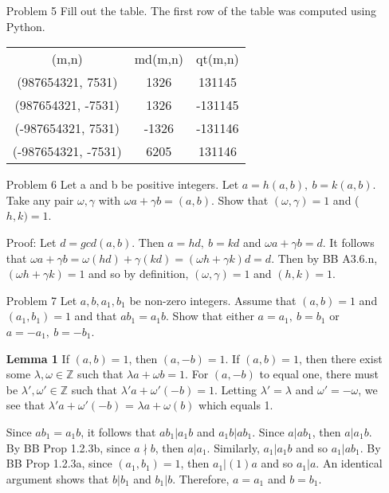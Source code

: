 \documentclass[letterpaper]{article}
\newcommand{\Integers}{\mathbb{Z}}
\begin{document}
\begin{itemize}
      \item[Problem 5] Fill out the table. The first row of the table was computed using Python.
            \begin{center}
                  \begin{tabular}{ c c c }
                        (m,n)               & md(m,n) & qt(m,n) \\
                        (987654321, 7531)   & 1326    & 131145  \\
                        (987654321, -7531)  & 1326    & -131145 \\
                        (-987654321, 7531)  & -1326   & -131146 \\
                        (-987654321, -7531) & 6205    & 131146
                  \end{tabular}
            \end{center}

      \item[Problem 6]Let a and b be positive integers. Let \(a = h(a, b),\ b = k(a, b)\). Take any pair \(\omega, \gamma\) with \(\omega a + \gamma b = (a, b)\). Show that \((\omega, \gamma) = 1\)  and (\(h, k) = 1\).

            Proof: Let \(d = gcd(a, b)\). Then \(a = hd,\ b = kd\) and \(\omega a + \gamma b = d\). It follows that \(\omega a + \gamma b = \omega(hd) + \gamma(kd) = (\omega h + \gamma k)d = d\).
            Then by BB A3.6.n, \((\omega h + \gamma k) = 1\) and so by definition, \((\omega, \gamma) = 1\) and \((h, k) = 1\).

      \item[Problem 7] Let \(a, b, a_1, b_1\) be non-zero integers. Assume that \((a, b) = 1\) and \((a_1, b_1) = 1\) and that \(ab_1 = a_1b\). Show that either \(a = a_1,\ b = b_1\) or \(a = -a_1,\ b = -b_1\).


            \textbf{Lemma 1} If \((a, b) = 1\), then \((a, -b) = 1\).
            If \((a, b) = 1\), then there exist some \(\lambda, \omega \in \Integers\) such that \(\lambda a + \omega b = 1\). For \((a, -b)\) to equal one, there must be \(\lambda', \omega' \in \Integers\) such that \(\lambda' a + \omega' (-b) = 1\). Letting \(\lambda' = \lambda\) and \(\omega' = -\omega\), we see that \(\lambda' a + \omega' (-b)\) = \(\lambda a + \omega(b)\) which equals 1.

            Since \(ab_1 = a_1b\), it follows that \(ab_1 | a_1b\) and \(a_1b | ab_1\). Since \(a | ab_1\), then \(a | a_1b\). By BB Prop 1.2.3b, since \(a \nmid b\), then \(a | a_1\). Similarly, \(a_1 | a_1b\) and so \(a_1 | ab_1\). By BB Prop 1.2.3a, since \((a_1,b_1) = 1\), then \(a_1 | (1)a\) and so \(a_1 | a\). An identical argument shows that \(b | b_1\) and \( b_ 1 | b\). Therefore, \(a = a_1\) and \(b = b_1\).


\end{itemize}
\end{document}
